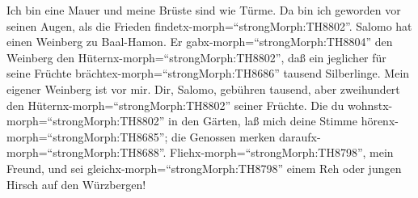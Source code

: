  Ich bin eine Mauer und meine Brüste sind wie Türme. Da bin
ich geworden vor seinen Augen, als die Frieden
findetx-morph=``strongMorph:TH8802''.  Salomo hat einen
Weinberg zu Baal-Hamon. Er gabx-morph=``strongMorph:TH8804'' den
Weinberg den Hüternx-morph=``strongMorph:TH8802'', daß ein jeglicher für
seine Früchte brächtex-morph=``strongMorph:TH8686'' tausend Silberlinge.
 Mein eigener Weinberg ist vor mir. Dir, Salomo, gebühren
tausend, aber zweihundert den Hüternx-morph=``strongMorph:TH8802''
seiner Früchte.  Die du
wohnstx-morph=``strongMorph:TH8802'' in den Gärten, laß mich deine
Stimme hörenx-morph=``strongMorph:TH8685''; die Genossen merken
daraufx-morph=``strongMorph:TH8688''. 
Fliehx-morph=``strongMorph:TH8798'', mein Freund, und sei
gleichx-morph=``strongMorph:TH8798'' einem Reh oder jungen Hirsch auf
den Würzbergen!
